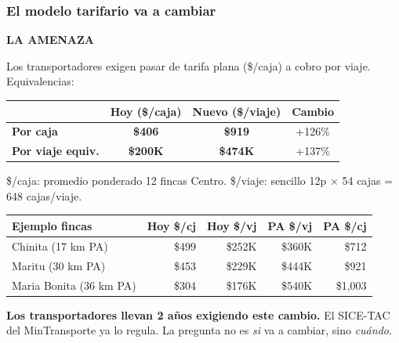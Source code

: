 \documentclass[aspectratio=169, 10pt]{beamer}
\newcommand{\tagline}[2]{{\scriptsize\color{#1}\textbf{\MakeUppercase{#2}}}}
\begin{document}
\begin{frame}
\frametitle{El modelo tarifario va a cambiar}
\tagline{amarillo}{La Amenaza}
\vspace{-2pt}

{\scriptsize Los transportadores exigen pasar de tarifa plana (\$/caja) a cobro por viaje. Equivalencias:}

\vspace{4pt}
\begin{center}
\scriptsize
\renewcommand{\arraystretch}{1.15}
\begin{tabular}{l c c c}
    \toprule
    & \textbf{Hoy (\$/caja)} & \textbf{Nuevo (\$/viaje)} & \textbf{Cambio} \\
    \midrule
    \textbf{Por caja} & \textcolor{amarillo}{\textbf{\$406}} & \textcolor{rojo}{\textbf{\$919}} & \textcolor{rojo}{+126\%} \\[2pt]
    \textbf{Por viaje equiv.} & \textcolor{amarillo}{\textbf{\$200K}} & \textcolor{rojo}{\textbf{\$474K}} & \textcolor{rojo}{+137\%} \\
    \bottomrule
\end{tabular}
\end{center}

\vspace{2pt}
{\tiny\color{gris} \$/caja: promedio ponderado 12 fincas Centro. \$/viaje: sencillo 12p $\times$ 54 cajas = 648 cajas/viaje.}

\vspace{4pt}
\begin{center}
\scriptsize
\renewcommand{\arraystretch}{0.9}
\begin{tabular}{l r r r r}
    \toprule
    \textbf{Ejemplo fincas} & \textbf{Hoy \$/cj} & \textbf{Hoy \$/vj} & \textbf{PA \$/vj} & \textbf{PA \$/cj} \\
    \midrule
    Chinita (17 km PA)       & \$499 & \$252K & \$360K & \$712 \\
    Maritu (30 km PA)        & \$453 & \$229K & \$444K & \$921 \\
    Maria Bonita (36 km PA)  & \$304 & \$176K & \$540K & \$1,003 \\
    \bottomrule
\end{tabular}
\end{center}

\vspace{2pt}
\colorbox{amarilloclaro}{\parbox{\dimexpr\textwidth-12pt}{\scriptsize\strut
\textcolor{amarillo}{\textbf{Los transportadores llevan 2 a\~nos exigiendo este cambio.}}
El SICE-TAC del MinTransporte ya lo regula.
La pregunta no es \textit{si} va a cambiar, sino \textit{cu\'ando}.\strut}}
\end{frame}
\end{document}
